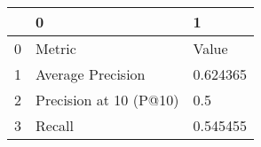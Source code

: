 \begin{tabular}{lll}
\toprule
{} &                       0 &         1 \\
\midrule
0 &                  Metric &     Value \\
1 &       Average Precision &  0.624365 \\
2 &  Precision at 10 (P@10) &       0.5 \\
3 &                  Recall &  0.545455 \\
\bottomrule
\end{tabular}

